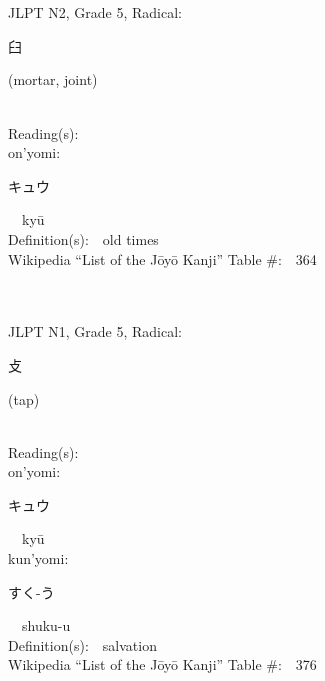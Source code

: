 \begin{multicols}{2}
\ \ \\
{\fontsize{34pt}{40pt}  }\ \ \\  %
{JLPT N2, Grade 5, Radical:\ \ {\begin{CJK}{UTF8}{min} 臼 \end{CJK}} (mortar, joint) } \\
Reading(s):\ \ \\
{\hspace*{1em}}on'yomi:\ \ \\
{\hspace*{2em}}{\begin{CJK}{UTF8}{min} キュウ \end{CJK}}\ \ ky\=u\ \ \\
Definition(s):\ \ old times \\
Wikipedia ``List of the J\=oy\=o Kanji'' Table \#:\ \ 364 \\
\ \ \\
{\fontsize{34pt}{40pt}  }\ \ \\  %
{JLPT N1, Grade 5, Radical:\ \ {\begin{CJK}{UTF8}{min} 攴 \end{CJK}} (tap) } \\
Reading(s):\ \ \\
{\hspace*{1em}}on'yomi:\ \ \\
{\hspace*{2em}}{\begin{CJK}{UTF8}{min} キュウ \end{CJK}}\ \ ky\=u\ \ \\
{\hspace*{1em}}kun'yomi:\ \ \\
{\hspace*{2em}}{\begin{CJK}{UTF8}{min} すく-う \end{CJK}}\ \ shuku-u\ \ \\
Definition(s):\ \ salvation \\
Wikipedia ``List of the J\=oy\=o Kanji'' Table \#:\ \ 376 \\
\ \ \\
{\fontsize{34pt}{40pt}  }\ \ \\  %

\end{multicols}

